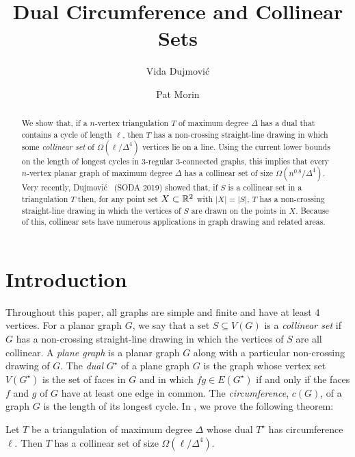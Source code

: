 \documentclass[a4paper,UKenglish]{socg-lipics-v2019}
\title{Dual Circumference and Collinear Sets}
\author{Vida Dujmovi\'c}
       {School of Computer Science and Electrical Engineering, 
        University of Ottawa, Canada \and \url{https://cglab.ca/~vida/}}
       {vida.dujmovic@uottawa.ca}
       {} %
       {} %
\author{Pat Morin}
       {School of Computer Science,
        Carleton University, Canada \and \url{https://cglab.ca/~morin/}}
       {morin@scs.carleton.ca}
       {} %
       {} %
\newcommand{\dual}[1]{{#1}^\star}
\begin{document}
\maketitle


\begin{abstract}
   We show that, if a $n$-vertex triangulation $T$ of maximum degree
   $\Delta$ has a dual that contains a cycle of length $\ell$, then $T$
   has a non-crossing straight-line drawing in which some \emph{collinear
   set} of $\Omega(\ell/\Delta^4)$ vertices lie on a line.  Using the
   current lower bounds on the length of longest cycles in 3-regular
   3-connected graphs, this implies that every $n$-vertex planar
   graph of maximum degree $\Delta$ has a collinear set of size
   $\Omega(n^{0.8}/\Delta^4)$.  Very recently, Dujmovi\'c \etal\ (SODA
   2019) showed that, if $S$ is a collinear set in a triangulation $T$
   then, for any point set $X\subset\mathbb{R}^2$ with $|X|=|S|$, $T$ has a
   non-crossing straight-line drawing in which the vertices of $S$ are
   drawn on the points in $X$.  Because of this, collinear sets have
   numerous applications in graph drawing and related areas.
\end{abstract}

\section{Introduction}

Throughout this paper, all graphs are simple and finite and have at least
4 vertices.  For a planar graph $G$, we say that a set $S\subseteq V(G)$
is a \emph{collinear set} if $G$ has a non-crossing straight-line drawing
in which the vertices of $S$ are all collinear.  A \emph{plane graph}
is a planar graph $G$ along
with a particular non-crossing drawing of $G$.  The \emph{dual} $\dual{G}$
of a plane graph $G$ is the graph whose vertex set $V(\dual{G})$
is the set of faces in $G$ and in which $fg\in E(\dual{G})$ if and
only if the faces $f$ and $g$ of $G$ have at least one edge in common.
The \emph{circumference}, $c(G)$, of a graph $G$ is the length of its
longest cycle. In , we prove the following theorem:

\begin{thm}
  Let $T$ be a triangulation of maximum degree $\Delta$ whose dual
  $\dual{T}$ has circumference $\ell$. Then $T$ has a collinear set of
  size $\Omega(\ell/\Delta^4)$.
\end{thm}
\end{document}
